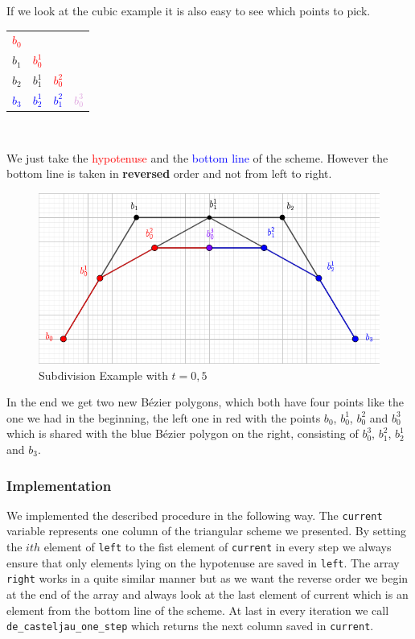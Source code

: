 \begin{example}
If we look at the cubic example it is also easy to see which points to pick.
\begin{center}
  \begin{tabular}{ l c r r}
  \textcolor{red}{$b_0$} &         \\
  $b_1$ & \textcolor{red}{$b_0^1$} &      \\
  $b_2$ & $b_1^1$ & \textcolor{red}{$b_0^2$}    \\
 \textcolor{blue}{$b_3$} & \textcolor{blue}{$b_2^1$} & \textcolor{blue}{$b_1^2$} & \textcolor{Plum}{$b_0^3$}\\
\end{tabular}
\\
\end{center}

We just take the \textcolor{red}{hypotenuse} and the \textcolor{blue}{bottom line} of the scheme. However the bottom line is taken in \textbf{reversed} order and not from left to right.
\begin{figure}[H]
    \centering
    \includegraphics[width=\textwidth]{SubdivisionExamplePic.PNG}
    \caption{Subdivision Example with $t=0,5$}
    \label{fig:my_label}
\end{figure}
In the end we get two new Bézier polygons, which both have four points like the one we had in the beginning, the left one in red with the points $b_0$, $b^1_0$, $b^2_0$ and $b^3_0$ which is shared with the blue Bézier polygon on the right, consisting of $b^3_0$, $b^2_1$, $b^1_2$ and $b_3$.
\end{example}


\subsubsection{Implementation}
We implemented the described procedure in the following way. The \texttt{current} variable represents one column of the triangular scheme we presented. By setting the $ith$ element of \texttt{left} to the fist element of \texttt{current} in every step we always ensure that only elements lying on the hypotenuse are saved in \texttt{left}. The array \texttt{right} works in a quite similar manner but as we want the reverse order we begin at the end of the array and always look at the last element of current which is an element from the bottom line of the scheme. At last in every iteration we call \texttt{de\_casteljau\_one\_step} which returns the next column saved in \texttt{current}. 

